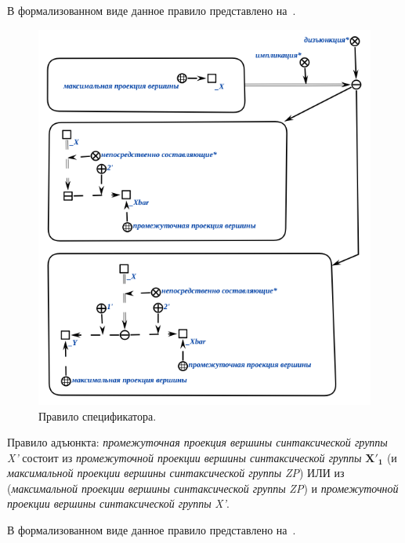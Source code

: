 В формализованном виде данное правило представлено на~\textit{}.

\begin{figure}[h]
    \centering
    \includegraphics[scale=0.8]{images/part2/chapter_lang/specifier_rule}
    \caption{Правило спецификатора.}
    \label{fig:specifier_rule}
\end{figure}

Правило адъюнкта: \textit{промежуточная проекция вершины синтаксической группы} \textit{X'} состоит из \textit{промежуточной проекции вершины синтаксической группы} \textit{$\bm{X'_1}$} (и \textit{максимальной проекции вершины синтаксической группы} \textit{ZP}) ИЛИ из (\textit{максимальной проекции вершины синтаксической группы} \textit{ZP}) и \textit{промежуточной проекции вершины синтаксической группы} \textit{X'}.


В формализованном виде данное правило представлено на~\textit{}.


